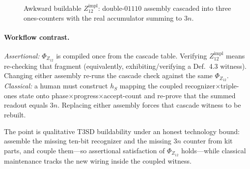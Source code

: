 \begin{figure}[!ht]
{%
  }
  \caption{Awkward buildable $Z_{12}^{\mathrm{impl}}$: double-$01110$ assembly cascaded into three ones-counters with the real accumulator summing to $3n$.}
  \label{fig:cascade-impl}
\end{figure}

\paragraph{Workflow contrast.}
\textit{Assertional:} $\Phi_{Z_{12}}$ is compiled once from the cascade table. Verifying $Z_{12}^{\mathrm{impl}}$ means re-checking that fragment (equivalently, exhibiting/verifying a Def.~4.3 witness). Changing either assembly re-runs the cascade check against the same $\Phi_{Z_{12}}$.
\textit{Classical:} a human must construct $h_S$ mapping the coupled recognizer$\times$triple-ones state onto phase$\times$progress$\times$accept-count and re-prove that the summed readout equals $3n$. Replacing either assembly forces that cascade witness to be rebuilt.

The point is qualitative T3SD buildability under an honest technology bound: assemble the missing ten-bit recognizer and the missing $3n$ counter from kit parts, and couple them---so assertional satisfaction of $\Phi_{Z_{12}}$ holds---while classical maintenance tracks the new wiring inside the coupled witness.

\FloatBarrier

